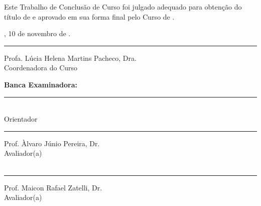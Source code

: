 \begin{folhadeaprovacao}
    \begin{center}
        \imprimirautor

        \vfill

        \textbf{\MakeUppercase{\imprimirtitulo}}

        \vfill

        Este Trabalho de Conclusão de Curso foi julgado adequado para obtenção do título de \formacao{} e aprovado em sua forma final pelo Curso de \programa.

        \bigskip

        \imprimirlocal, 10 de novembro de \imprimirdata.

        \vfill

        \rule{6cm}{0.5pt}

        Profa. Lúcia Helena Martins Pacheco, Dra.\\
        Coordenadora do Curso

        \vfill

        \textbf{Banca Examinadora:}

        \vfill

        \rule{6cm}{0.5pt}

        \imprimirorientador\\
        Orientador\\
        \imprimirinstituicao

        \bigskip

        \rule{6cm}{0.5pt}

        Prof. Àlvaro Júnio Pereira, Dr.\\
        Avaliador(a)\\
        \imprimirinstituicao\\

        \bigskip

        \rule{6cm}{0.5pt}

        Prof. Maicon Rafael Zatelli, Dr.\\
        Avaliador(a)\\
        \imprimirinstituicao\\
    \end{center}
\end{folhadeaprovacao}
